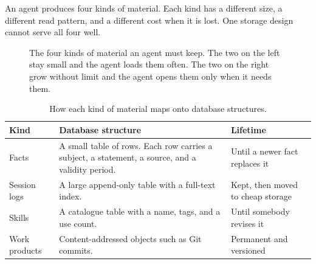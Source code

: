 \documentclass[11pt,a4paper]{article}
\begin{document}
An agent produces four kinds of material. Each kind has a different size,
a different read pattern, and a different cost when it is lost. One
storage design cannot serve all four well.

\begin{figure}[H]
\centering
{}
\caption[Four kinds of material]{The four kinds of material an agent must keep. The two on the
left stay small and the agent loads them often. The two on the right grow
without limit and the agent opens them only when it needs them.}
\label{fig:kinds}
\end{figure}

\begin{table}[H]
\centering
\caption[Material and its database structure]{How each kind of material maps onto database structures.}
\label{tab:kinds}
{\small
\begin{tabularx}{\textwidth}{L{2.1cm} X L{2.5cm}}
\toprule
\sffamily\bfseries Kind & \sffamily\bfseries Database structure &
\sffamily\bfseries Lifetime \\
\midrule
Facts & A small table of rows. Each row carries a subject, a statement,
a source, and a validity period. & Until a newer fact replaces it \\
Session logs & A large append-only table with a full-text index. &
Kept, then moved to cheap storage \\
Skills & A catalogue table with a name, tags, and a use count. &
Until somebody revises it \\
Work products & Content-addressed objects such as Git commits. &
Permanent and versioned \\
\bottomrule
\end{tabularx}}
\end{table}
\end{document}

